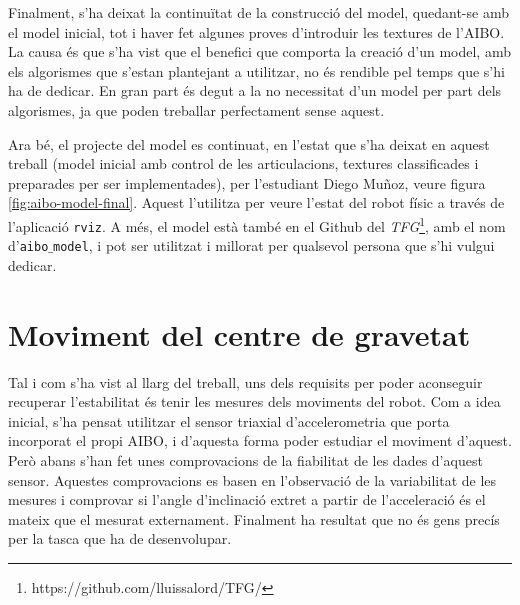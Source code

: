 \documentclass[12pt,a4paper,final,twoside]{report}
\begin{document}

Finalment, s'ha deixat la continuïtat de la construcció del model, quedant-se amb el model inicial, tot i haver fet algunes proves d'introduir les textures de l'AIBO. La causa és que s'ha vist que el benefici que comporta la creació d'un model, amb els algorismes que s'estan plantejant a utilitzar, no és rendible pel temps que s'hi ha de dedicar. En gran part és degut a la no necessitat d'un model per part dels algorismes, ja que poden treballar perfectament sense aquest.

Ara bé, el projecte del model es continuat, en l'estat que s'ha deixat en aquest treball (model inicial amb control de les articulacions, textures classificades i preparades per ser implementades), per l'estudiant Diego Muñoz, veure figura \ref{fig:aibo-model-final}. Aquest l'utilitza per veure l'estat del robot físic a través de l'aplicació \texttt{rviz}. A més, el model està també en el Github del \textit{TFG}\footnote{https://github.com/lluissalord/TFG/}, amb el nom d'\texttt{aibo$\_$model}, i pot ser utilitzat i millorat per qualsevol persona que s'hi vulgui dedicar.


\section{Moviment del centre de gravetat}
\label{Moviment-CdG}



Tal i com s'ha vist al llarg del treball, uns dels requisits per poder aconseguir recuperar l'estabilitat és tenir les mesures dels moviments del robot. Com a idea inicial, s'ha pensat utilitzar el sensor triaxial d'accelerometria que porta incorporat el propi AIBO, i d'aquesta forma poder estudiar el moviment d'aquest. Però abans s'han fet unes comprovacions de la fiabilitat de les dades d'aquest sensor. Aquestes comprovacions es basen en l'observació de la variabilitat de les mesures i comprovar si l'angle d'inclinació extret a partir de l'acceleració és el mateix que el mesurat externament. Finalment ha resultat que no és gens precís per la tasca que ha de desenvolupar.
\end{document}

